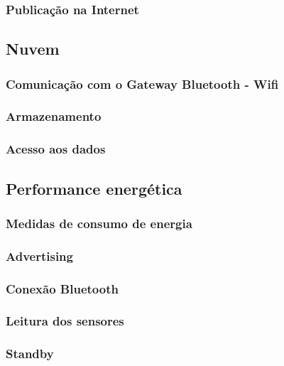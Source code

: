 \subsubsection{Publicação na Internet}

\subsection{Nuvem}

\subsubsection{Comunicação com o Gateway Bluetooth - Wifi}

\subsubsection{Armazenamento}

\subsubsection{Acesso aos dados}

\subsection{Performance energética}

\subsubsection{Medidas de consumo de energia}

\subsubsection{Advertising}

\subsubsection{Conexão Bluetooth}

\subsubsection{Leitura dos sensores}

\subsubsection{Standby}